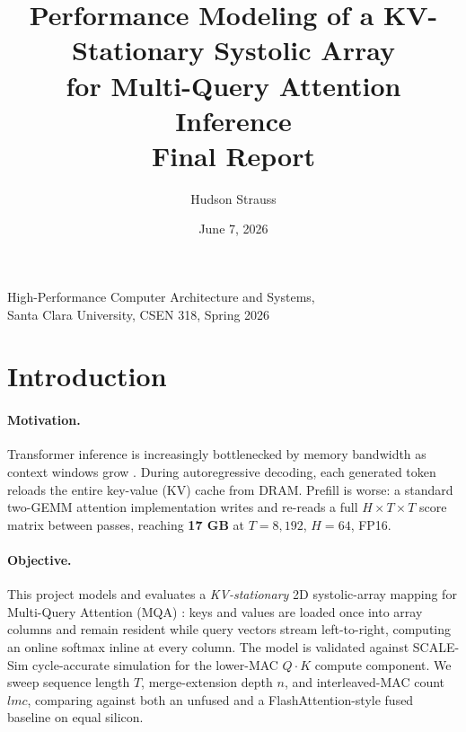 \documentclass[11pt]{article}
\title{
\textbf{Performance Modeling of a KV-Stationary Systolic Array\\
for Multi-Query Attention Inference}
\\[0.8ex]
\large Final Report
}
\author{
Hudson Strauss
}
\date{June 7, 2026}
\begin{document}
\maketitle

\begin{center}
\small High-Performance Computer Architecture and Systems,\\
Santa Clara University, CSEN 318, Spring 2026
\end{center}

\thispagestyle{empty}
\clearpage

\section{Introduction}

\paragraph{Motivation.}
Transformer inference is increasingly bottlenecked by memory bandwidth as context
windows grow \parencite{dao2022flashattention}.
During autoregressive decoding, each generated token reloads the entire key-value (KV)
cache from DRAM.
Prefill is worse: a standard two-GEMM attention implementation writes and re-reads a
full $H\!\times\!T\!\times\!T$ score matrix between passes,
reaching \textbf{17 GB} at $T{=}8{,}192$, $H{=}64$, FP16.

\paragraph{Objective.}
This project models and evaluates a \emph{KV-stationary} 2D systolic-array
mapping for Multi-Query Attention (MQA) \parencite{ainslie2023gqa}: keys and
values are loaded once into array columns and remain resident while query
vectors stream left-to-right, computing an online softmax inline at every
column.
The model is validated against SCALE-Sim \parencite{samajdar2020systematic}
cycle-accurate simulation for the lower-MAC $Q\!\cdot\!K$ compute component.
We sweep sequence length $T$, merge-extension depth $n$, and interleaved-MAC
count $lmc$, comparing against both an unfused and a FlashAttention-style fused
baseline on equal silicon.
\end{document}
